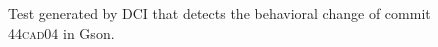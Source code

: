 \begin{figure}[h]
\centering
{}
\caption{Test generated by DCI that detects the behavioral change of commit \textsc{44cad04} in Gson.}
\label{fig:ampl_gson}
\end{figure}

